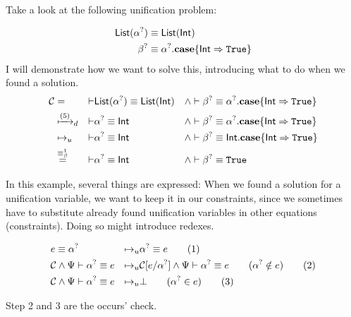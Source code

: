 \documentclass[twoside,12pt,a4paper]{article}
\begin{document}
Take a look at the following unification problem:
\begin{example}
    \begin{align*}
        \mathsf{List(\alpha^?)}&\equiv \mathsf{List(Int)}\\
        \beta^?&\equiv \alpha^?.\textbf{case}\{\mathsf{Int}\Rightarrow\mathtt{True}\}
    \end{align*}        
    I will demonstrate how we want to solve this, introducing what to do when we found a solution.
    \begin{align*}
        \mathcal{C} &= &\vdash& \mathsf{List(\alpha^?)}\equiv \mathsf{List(Int)} &\wedge&
        \vdash \beta^?\equiv \alpha^?.\textbf{case}\{\mathsf{Int}\Rightarrow\mathtt{True}\}\\
        &\xmapsto{(5)}_d &\vdash& \mathsf{\alpha^?\equiv Int} &\wedge& 
        \vdash \beta^?\equiv \alpha^?.\textbf{case}\{\mathsf{Int}\Rightarrow\mathtt{True}\}\\
        &\mapsto_u &\vdash&\mathsf{\alpha^?\equiv Int} &\wedge&
        \vdash \beta^?\equiv \mathsf{Int}.\textbf{case}\{\mathsf{Int}\Rightarrow\mathtt{True}\}\\
        &\stackrel{\equiv_{\beta}^1}{=} &\vdash&\mathsf{\alpha^?\equiv Int} &\wedge&
        \vdash \beta^?\equiv \mathtt{True}
    \end{align*}    
\end{example}
In this example, several things are expressed: When we found a solution for a unification variable, 
we want to keep it in our constraints, since we sometimes have to substitute already found unification variables in other equations (constraints).
Doing so might introduce redexes. 
\begin{definition}[Unification]
    \begin{align*}
        & e \equiv\alpha^?
        &\mapsto_u& \alpha^? \equiv e 
        \tag{1}\\
        &\mathcal{C} \wedge \Psi \vdash \alpha^? \equiv e 
        &\mapsto_u& \mathcal{C}[e/\alpha^?] \wedge \Psi \vdash \alpha^? \equiv e \qquad (\alpha^? \notin e)
        \tag{2}\\
        &\mathcal{C} \wedge \Psi \vdash \alpha^? \equiv e
        &\mapsto_u& \bot \qquad(\alpha^?\in e)
        \tag{3}
    \end{align*}
\end{definition}
Step 2 and 3 are the occurs' check.
\end{document}
